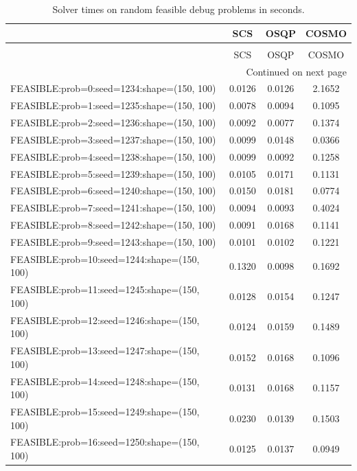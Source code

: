 \begin{longtable}{lccc}
\caption{Solver times on random feasible debug problems in seconds.}
\label{t-random feasible debug-results}\\
\toprule
{} &    SCS &   OSQP &  COSMO \\
\midrule
\endfirsthead
\caption[]{Solver times on random feasible debug problems in seconds.} \\
\toprule
{} &    SCS &   OSQP &  COSMO \\
\midrule
\endhead
\midrule
\multicolumn{4}{r}{{Continued on next page}} \\
\midrule
\endfoot

\bottomrule
\endlastfoot
FEASIBLE:prob=0:seed=1234:shape=(150, 100)   & 0.0126 & 0.0126 & 2.1652 \\
FEASIBLE:prob=1:seed=1235:shape=(150, 100)   & 0.0078 & 0.0094 & 0.1095 \\
FEASIBLE:prob=2:seed=1236:shape=(150, 100)   & 0.0092 & 0.0077 & 0.1374 \\
FEASIBLE:prob=3:seed=1237:shape=(150, 100)   & 0.0099 & 0.0148 & 0.0366 \\
FEASIBLE:prob=4:seed=1238:shape=(150, 100)   & 0.0099 & 0.0092 & 0.1258 \\
FEASIBLE:prob=5:seed=1239:shape=(150, 100)   & 0.0105 & 0.0171 & 0.1131 \\
FEASIBLE:prob=6:seed=1240:shape=(150, 100)   & 0.0150 & 0.0181 & 0.0774 \\
FEASIBLE:prob=7:seed=1241:shape=(150, 100)   & 0.0094 & 0.0093 & 0.4024 \\
FEASIBLE:prob=8:seed=1242:shape=(150, 100)   & 0.0091 & 0.0168 & 0.1141 \\
FEASIBLE:prob=9:seed=1243:shape=(150, 100)   & 0.0101 & 0.0102 & 0.1221 \\
FEASIBLE:prob=10:seed=1244:shape=(150, 100)  & 0.1320 & 0.0098 & 0.1692 \\
FEASIBLE:prob=11:seed=1245:shape=(150, 100)  & 0.0128 & 0.0154 & 0.1247 \\
FEASIBLE:prob=12:seed=1246:shape=(150, 100)  & 0.0124 & 0.0159 & 0.1489 \\
FEASIBLE:prob=13:seed=1247:shape=(150, 100)  & 0.0152 & 0.0168 & 0.1096 \\
FEASIBLE:prob=14:seed=1248:shape=(150, 100)  & 0.0131 & 0.0168 & 0.1157 \\
FEASIBLE:prob=15:seed=1249:shape=(150, 100)  & 0.0230 & 0.0139 & 0.1503 \\
FEASIBLE:prob=16:seed=1250:shape=(150, 100)  & 0.0125 & 0.0137 & 0.0949 \\

\end{longtable}
